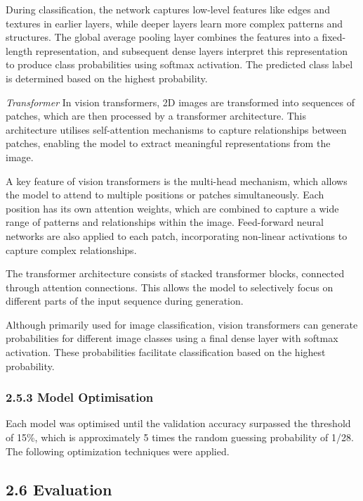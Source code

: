 \documentclass[letterpaper,9pt,twocolumn,twoside,]{pinp}
\begin{document}
During classification, the network captures low-level features like
edges and textures in earlier layers, while deeper layers learn more
complex patterns and structures. The global average pooling layer
combines the features into a fixed-length representation, and subsequent
dense layers interpret this representation to produce class
probabilities using softmax activation. The predicted class label is
determined based on the highest probability.

\emph{Transformer} In vision transformers, 2D images are transformed
into sequences of patches, which are then processed by a transformer
architecture. This architecture utilises self-attention mechanisms to
capture relationships between patches, enabling the model to extract
meaningful representations from the image.

A key feature of vision transformers is the multi-head mechanism, which
allows the model to attend to multiple positions or patches
simultaneously. Each position has its own attention weights, which are
combined to capture a wide range of patterns and relationships within
the image. Feed-forward neural networks are also applied to each patch,
incorporating non-linear activations to capture complex relationships.

The transformer architecture consists of stacked transformer blocks,
connected through attention connections. This allows the model to
selectively focus on different parts of the input sequence during
generation.

Although primarily used for image classification, vision transformers
can generate probabilities for different image classes using a final
dense layer with softmax activation. These probabilities facilitate
classification based on the highest probability.

\hypertarget{model-optimisation}{%
\subsubsection{2.5.3 Model Optimisation}\label{model-optimisation}}

Each model was optimised until the validation accuracy surpassed the
threshold of 15\%, which is approximately 5 times the random guessing
probability of 1/28. The following optimization techniques were applied.

\hypertarget{evaluation}{%
\subsection{2.6 Evaluation}\label{evaluation}}
\end{document}
